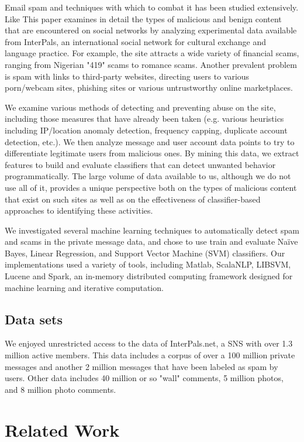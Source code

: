 \documentclass[preprint]{acm_proc_article-sp}
\begin{document}
Email spam and techniques with which to combat it has been studied 
extensively. Like
This paper examines in detail the types of malicious and benign
content that are encountered on social networks by analyzing
experimental data available from InterPals, an international social network
for cultural exchange and language practice. For example, the site
attracts a wide variety of financial scams, ranging from Nigerian
"419" scams to romance scams. Another prevalent problem is spam with
links to third-party websites, directing users to various porn/webcam
sites, phishing sites or various untrustworthy online marketplaces.

We examine various methods of detecting and preventing abuse
on the site, including those measures that have already been taken
(e.g. various heuristics including IP/location anomaly detection,
frequency capping, duplicate account detection, etc.). We then analyze 
message and user account data points to try to differentiate legitimate users
from malicious ones. By mining this data, we extract features 
to build and evaluate classifiers that can detect unwanted behavior 
programmatically. The large volume of data available to us, although we do 
not use all of it, provides a unique perspective both on the types of
malicious content that exist on such sites as well as on the
effectiveness of classifier-based approaches to identifying
these activities.

We investigated several machine learning techniques to automatically 
detect spam and scams in the private message data, and chose to use 
train and evaluate Na\"ive Bayes, Linear Regression, and 
Support Vector Machine (SVM) classifiers. Our implementations used 
a variety of tools, including Matlab, ScalaNLP, LIBSVM, Lucene and Spark, 
an in-memory distributed computing framework designed for machine 
learning and iterative computation.


\subsection{Data sets}

We enjoyed unrestricted access to the data of InterPals.net, a SNS with 
over 1.3 million active members. This data includes a corpus of over a 
100 million private messages and another 2 million messages that have been 
labeled as spam by users. Other data includes 40 million or so "wall" 
comments, 5 million photos, and 8 million photo comments. 


\section{Related Work} 
\end{document}
